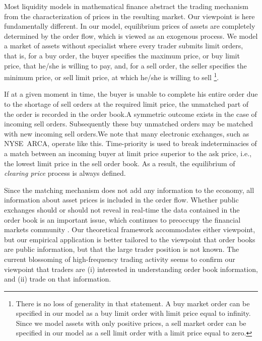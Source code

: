 \documentclass{article}
\begin{document}
Most liquidity models in mathematical finance abstract the trading mechanism
from the characterization of prices in the resulting market. Our viewpoint
is here fundamentally different. In our model, equilibrium prices of assets
are completely determined by the order flow, which is viewed as an exogenous
process. We model a market of assets without specialist where every trader
submits limit orders, that is, for a buy order, the buyer specifies the
maximum price, or buy limit price, that he/she is willing to pay, and, for a
sell order, the seller specifies the minimum price, or sell limit price, at
which he/she is willing to sell \footnote{%
There is no loss of generality in that statement. A buy market order can be
specified in our model as a buy limit order with limit price equal to
infinity. Since we model assets with only positive prices, a sell market
order can be specified in our model as a sell limit order with a limit price
equal to zero.}.

If at a given moment in time, the buyer is unable to complete his entire
order due to the shortage of sell orders at the required limit price, the
unmatched part of the order is recorded in the order book.A symmetric
outcome exists in the case of incoming sell orders. Subsequently these buy
unmatched orders may be matched with new incoming sell orders.We note that
many electronic exchanges, such as NYSE\ ARCA, operate like this.
Time-priority is used to break indeterminacies of a match between an
incoming buyer at limit price superior to the ask price, i.e., the lowest
limit price in the sell order book. As a result, the equilibrium of \textit{%
clearing price} process is always defined.

Since the matching mechanism does not add any information to the economy,
all information about asset prices is included in the order flow. Whether
public exchanges should or should not reveal in real-time the data contained
in the order book is an important issue, which continues to preoccupy the
financial markets community \cite{WW02}. Our theoretical framework
accommodates either viewpoint, but our empirical application is better
tailored to the viewpoint that order books are public information, but that
the large trader position is not known. The current blossoming of
high-frequency trading activity \cite{BRZ,BLT06,Eng00,Hau08} seems
to confirm our viewpoint that traders are (i) interested in understanding
order book information, and (ii) trade on that information.
\end{document}
